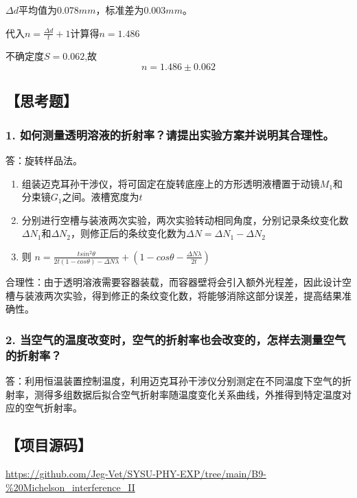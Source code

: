 \documentclass[12pt,a4paper,UTF8]{ctexart}
\begin{document}
		$\Delta d$平均值为$0.078mm$，标准差为$0.003mm$。
		
		代入$n = \frac{\Delta d}{t}+1$计算得$n = 1.486$

		不确定度$S = 0.062$,故
		$$
		n = 1.486 \pm 0.062
		$$

		

\subsection*{【思考题】}
	\subsubsection*{1. 如何测量透明溶液的折射率？请提出实验方案并说明其合理性。}
		答：旋转样品法。
		\begin{enumerate}[label=\arabic*.]
			\item 组装迈克耳孙干涉仪，将可固定在旋转底座上的方形透明液槽置于动镜$M_1$和分束镜$G_1$之间。液槽宽度为$t$		
			\item 分别进行空槽与装液两次实验，两次实验转动相同角度，分别记录条纹变化数$\Delta N_1$和$\Delta N_2$，则修正后的条纹变化数为$\Delta N=\Delta N_1-\Delta N_2$
			\item 则 $n = \frac{tsin^2\theta}{2t(1-cos\theta)-\Delta N \lambda}+ (1-cos\theta-\frac{\Delta N \lambda}{2t})$
		\end{enumerate}
		合理性：由于透明溶液需要容器装载，而容器壁将会引入额外光程差，因此设计空槽与装液两次实验，得到修正的条纹变化数，将能够消除这部分误差，提高结果准确性。
	\subsubsection*{2. 当空气的温度改变时，空气的折射率也会改变的，怎样去测量空气的折射率？}
		答：利用恒温装置控制温度，利用迈克耳孙干涉仪分别测定在不同温度下空气的折射率，测得多组数据后拟合空气折射率随温度变化关系曲线，外推得到特定温度对应的空气折射率。


\subsection*{【项目源码】}
\url{https://github.com/Jeg-Vet/SYSU-PHY-EXP/tree/main/B9-%20Michelson_interference_II}
		
\end{document}
